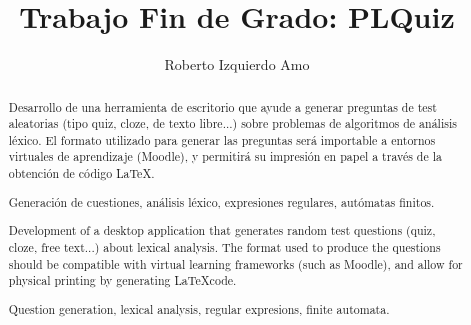 \documentclass[a4paper,10pt,oneside]{memoir}
\title{Trabajo Fin de Grado: PLQuiz}
\author{Roberto Izquierdo Amo}
\date{}
\makeatletter
\def\maketitle{
  \null
  \thispagestyle{empty}
  \vfill
  \begin{center}\leavevmode
    \normalfont
    {\LARGE \@author\par}
    \hrulefill\par
    {\huge \@title\par}
    \vskip 1cm
  \end{center}
  \vfill
  \null
  \cleardoublepage
  }
\makeatother
\begin{document}
\maketitle

\frontmatter

\renewcommand*\abstractname{Resumen}
\begin{abstract}
Desarrollo de una herramienta de escritorio que ayude a generar preguntas de test aleatorias (tipo quiz, cloze, de texto libre...) sobre problemas de algoritmos de análisis léxico.
El formato utilizado para generar las preguntas será importable a entornos virtuales de aprendizaje (Moodle), y permitirá su impresión en papel a través de la obtención de código \LaTeX .
\end{abstract}

\renewcommand*\abstractname{Descriptores}
\begin{abstract}
Generación de cuestiones, análisis léxico, expresiones regulares, autómatas finitos.
\end{abstract}

\clearpage

\renewcommand*\abstractname{Abstract}
\begin{abstract}
Development of a desktop application that generates random test questions (quiz, cloze, free text...) about lexical analysis.
The format used to produce the questions should be compatible with virtual learning frameworks (such as Moodle), and allow for physical printing by generating \LaTeX code.
\end{abstract}

\renewcommand*\abstractname{Keywords}
\begin{abstract}
Question generation, lexical analysis, regular expresions, finite automata.
\end{abstract}

\clearpage

\tableofcontents

\clearpage

\listoffigures

\clearpage

\listoftables

\mainmatter







\end{document}
